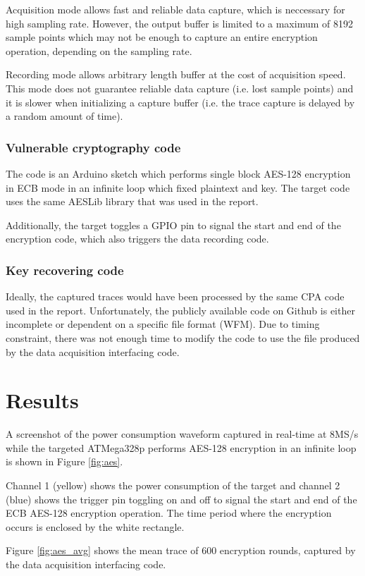 \documentclass[conference]{IEEEtran}
\begin{document}
Acquisition mode allows fast and reliable data capture, which is neccessary for high sampling rate. However, the output buffer is limited to a maximum of 8192 sample points which may not be enough to capture an entire encryption operation, depending on the sampling rate.

Recording mode allows arbitrary length buffer at the cost of acquisition speed. This mode does not guarantee  reliable data capture (i.e. lost sample points) and it is slower when initializing a capture buffer (i.e. the trace capture is delayed by a random amount of time).

\subsubsection{Vulnerable cryptography code}
The code is an Arduino sketch which performs single block AES-128 encryption in ECB mode in an infinite loop which fixed plaintext and key. The target code uses the same AESLib library that was used in the report.

Additionally, the target toggles a GPIO pin to signal the start and end of the encryption code, which also triggers the data recording code.

\subsubsection{Key recovering code}
Ideally, the captured traces would have been processed by the same CPA code used in the report. Unfortunately, the publicly available code on Github is either incomplete or dependent on a specific file format (WFM). Due to timing constraint, there was not enough time to modify the code to use the file produced by the data acquisition interfacing code.

\section{Results}
A screenshot of the power consumption waveform captured in real-time at 8MS/s while the targeted ATMega328p performs AES-128 encryption in an infinite loop is shown in Figure \ref{fig:aes}.

Channel 1 (yellow) shows the power consumption of the target and channel 2 (blue) shows the trigger pin toggling on and off to signal the start and end of the ECB AES-128 encryption operation. The time period where the encryption occurs is enclosed by the white rectangle.

Figure \ref{fig:aes_avg} shows the mean trace of 600 encryption rounds, captured by the data acquisition interfacing code.
\end{document}
